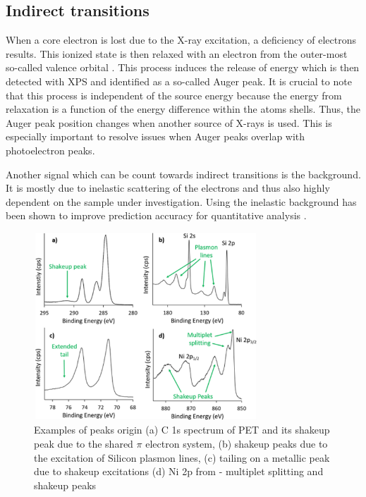 \subsection{Indirect transitions}
When a core electron is lost due to the X-ray excitation, a deficiency of electrons results. This ionized state is then relaxed with an electron from the outer-most so-called valence orbital \cite{stevie_introduction_2020}. This process induces the release of energy which is then detected with XPS and identified as a so-called Auger peak. It is crucial to note that this process is independent of the source energy because the energy from relaxation is a function of the energy difference within the atoms shells. Thus, the Auger peak position changes when another source of X-rays is used. This is especially important to resolve issues when Auger peaks overlap with photoelectron peaks.

Another signal which can be count towards indirect transitions is the background. It is mostly due to inelastic scattering of the electrons and thus also highly dependent on the sample under investigation. Using the inelastic background has been shown to improve prediction accuracy for quantitative analysis \cite{tougaard_practical_2020}.


\begin{figure}[H]
    \centering
    \includegraphics[width=0.75\textwidth]{Figures/peaks.png}
    \caption{Examples of peaks origin (a) C 1s spectrum of PET and its shakeup peak due to the shared $\pi$ electron system, (b) shakeup peaks due to the excitation of Silicon plasmon lines, (c) tailing on a metallic peak due to shakeup excitations (d) Ni 2p from  - multiplet splitting and shakeup peaks \cite{stevie_introduction_2020}}
    \label{fig:peaks}
\end{figure}


